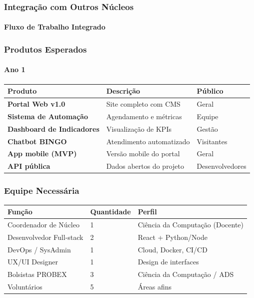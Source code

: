 \bigskip

\subsubsection{Integração com Outros Núcleos}

\paragraph{Fluxo de Trabalho Integrado}

\subsubsection{Produtos Esperados}

\paragraph{Ano 1}

\bigskip\noindent
\begin{tabular}{p{}p{}p{}}
\toprule
Produto & Descrição & Público \\
\hline
\textbf{Portal Web v1.0} & Site completo com CMS & Geral \\
\textbf{Sistema de Automação} & Agendamento e métricas & Equipe \\
\textbf{Dashboard de Indicadores} & Visualização de KPIs & Gestão \\
\textbf{Chatbot BINGO} & Atendimento automatizado & Visitantes \\
\textbf{App mobile (MVP)} & Versão mobile do portal & Geral \\
\textbf{API pública} & Dados abertos do projeto & Desenvolvedores \\
\bottomrule
\end{tabular}

\bigskip

\subsubsection{Equipe Necessária}

\bigskip\noindent
\begin{tabular}{p{}p{}p{}}
\toprule
Função & Quantidade & Perfil \\
\hline
Coordenador de Núcleo & 1 & Ciência da Computação (Docente) \\
Desenvolvedor Full-stack & 2 & React + Python/Node \\
DevOps / SysAdmin & 1 & Cloud, Docker, CI/CD \\
UX/UI Designer & 1 & Design de interfaces \\
Bolsistas PROBEX & 3 & Ciência da Computação / ADS \\
Voluntários & 5 & Áreas afins \\
\bottomrule
\end{tabular}

